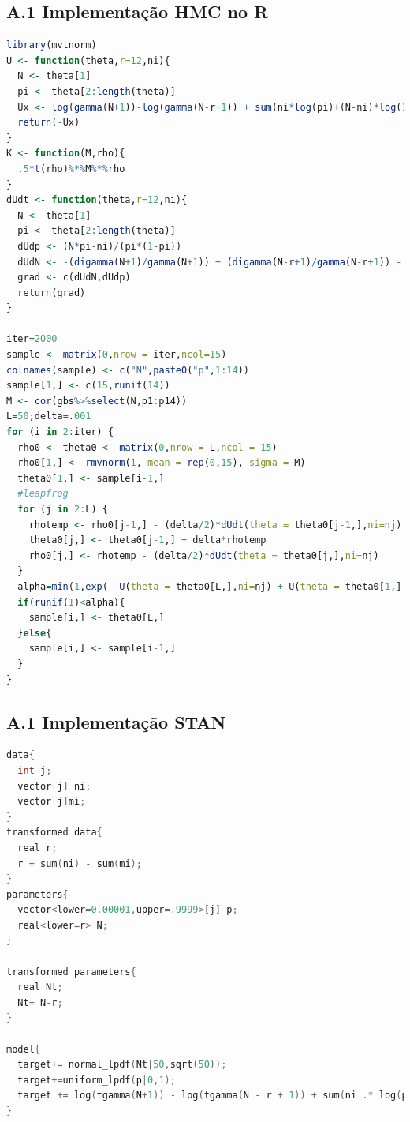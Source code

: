 \documentclass[a4paper,12pt,twoside]{article}
\begin{document}
\newpage
\subsection*{A.1 Implementação HMC no R}
\begin{lstlisting}[language=R]
library(mvtnorm)
U <- function(theta,r=12,ni){
  N <- theta[1]
  pi <- theta[2:length(theta)]
  Ux <- log(gamma(N+1))-log(gamma(N-r+1)) + sum(ni*log(pi)+(N-ni)*log(1-pi)) - .01*(N-50)^2
  return(-Ux)
}
K <- function(M,rho){
  .5*t(rho)%*%M%*%rho
}
dUdt <- function(theta,r=12,ni){
  N <- theta[1]
  pi <- theta[2:length(theta)]
  dUdp <- (N*pi-ni)/(pi*(1-pi))
  dUdN <- -(digamma(N+1)/gamma(N+1)) + (digamma(N-r+1)/gamma(N-r+1)) - sum(log(1-pi)) + .02*(N-50)
  grad <- c(dUdN,dUdp)
  return(grad)
}

iter=2000
sample <- matrix(0,nrow = iter,ncol=15)
colnames(sample) <- c("N",paste0("p",1:14))
sample[1,] <- c(15,runif(14))
M <- cor(gbs%>%select(N,p1:p14))
L=50;delta=.001
for (i in 2:iter) {
  rho0 <- theta0 <- matrix(0,nrow = L,ncol = 15)
  rho0[1,] <- rmvnorm(1, mean = rep(0,15), sigma = M)
  theta0[1,] <- sample[i-1,]
  #leapfrog
  for (j in 2:L) {
    rhotemp <- rho0[j-1,] - (delta/2)*dUdt(theta = theta0[j-1,],ni=nj)
    theta0[j,] <- theta0[j-1,] + delta*rhotemp
    rho0[j,] <- rhotemp - (delta/2)*dUdt(theta = theta0[j,],ni=nj)
  }
  alpha=min(1,exp( -U(theta = theta0[L,],ni=nj) + U(theta = theta0[1,],ni=nj)- K(M,rho0[L,]) + K(M,rho0[1,])))
  if(runif(1)<alpha){
    sample[i,] <- theta0[L,]
  }else{
    sample[i,] <- sample[i-1,]
  }
}
\end{lstlisting}
\newpage
\subsection*{A.1 Implementação STAN}
\begin{lstlisting}[language=c]
data{
  int j;
  vector[j] ni;
  vector[j]mi;
}
transformed data{
  real r;  
  r = sum(ni) - sum(mi);
}
parameters{
  vector<lower=0.00001,upper=.9999>[j] p;
  real<lower=r> N;
}

transformed parameters{
  real Nt;
  Nt= N-r;
}

model{
  target+= normal_lpdf(Nt|50,sqrt(50));
  target+=uniform_lpdf(p|0,1);
  target += log(tgamma(N+1)) - log(tgamma(N - r + 1)) + sum(ni .* log(p)  + (N-ni).*log(1-p));
}

\end{lstlisting}
\end{document}
